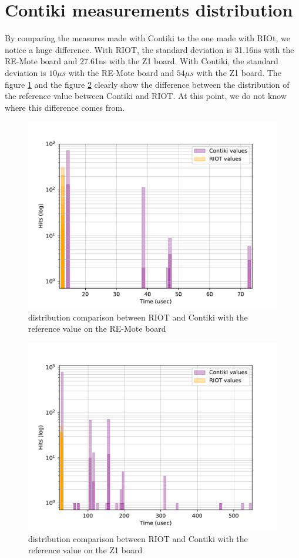 \newpage
\section{Contiki measurements distribution}

By comparing the measures made with Contiki to the one made with RIOt, we notice a huge difference.
With RIOT, the standard deviation is 31.16ns with the RE-Mote board and 27.61ns with the Z1 board.
With Contiki, the standard deviation is $10\mu s$ with the RE-Mote board and $54\mu s$ with the Z1 board.
The figure \ref{fig:deviation-ref-value-remote} and the figure \ref{fig:deviation-ref-value-z1} clearly show the difference between the distribution of the reference value between Contiki and RIOT.
At this point, we do not know where this difference comes from.

\begin{figure}[!ht]
  \centering
  \includegraphics[scale=.7]{assets/offset-remote.pdf}
  \caption{distribution comparison between RIOT and Contiki with the reference value on the RE-Mote board\label{fig:deviation-ref-value-remote}}
\end{figure}

\begin{figure}[!ht]
  \centering
  \includegraphics[scale=.7]{assets/offset-z1.pdf}
  \caption{distribution comparison between RIOT and Contiki with the reference value on the Z1 board\label{fig:deviation-ref-value-z1}}
\end{figure}